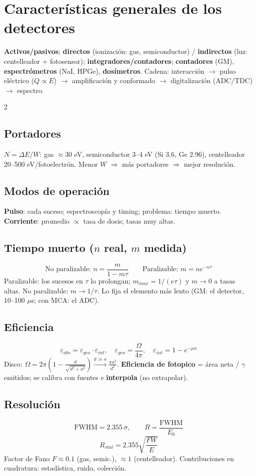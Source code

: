 \documentclass[10pt,a4paper]{article}
\begin{document}
\section{Características generales de los detectores}
\begin{clave}
\textbf{Activos/pasivos}; \textbf{directos} (ionización: gas, semiconductor) / \textbf{indirectos} (luz: centelleador + fotosensor);
\textbf{integradores/contadores}; \textbf{contadores} (GM), \textbf{espectrómetros} (NaI, HPGe), \textbf{dosímetros}.
Cadena: interacción $\to$ pulso eléctrico ($Q\propto E$) $\to$ amplificación y conformado $\to$ digitalización (ADC/TDC) $\to$ espectro.
\end{clave}
\begin{multicols}{2}
\subsection{Portadores}
$N=\Delta E/W$: gas $\approx30$ eV, semiconductor 3--4 eV (Si 3.6, Ge 2.96), centelleador 20--500 eV/fotoelectrón. Menor $W$ $\Rightarrow$ más portadores $\Rightarrow$ mejor resolución.
\subsection{Modos de operación}
\textbf{Pulso}: cada suceso; espectroscopía y timing; problema: tiempo muerto. \textbf{Corriente}: promedio $\propto$ tasa de dosis; tasas muy altas.
\subsection{Tiempo muerto ($n$ real, $m$ medida)}
\[ \text{No paralizable: } n=\frac{m}{1-m\tau}\qquad \text{Paralizable: } m=ne^{-n\tau} \]
Paralizable: los sucesos en $\tau$ lo prolongan; $m_{max}=1/(e\tau)$ y $m\to0$ a tasas altas. No paralizable: $m\to1/\tau$.
Lo fija el elemento más lento (GM: el detector, 10--100 $\mu$s; con MCA: el ADC).
\subsection{Eficiencia}
\[ \varepsilon_{abs}=\varepsilon_{geo}\cdot\varepsilon_{int},\quad \varepsilon_{geo}=\frac{\Omega}{4\pi},\quad \varepsilon_{int}=1-e^{-\mu x} \]
Disco: $\Omega=2\pi\left(1-\frac{d}{\sqrt{d^2+a^2}}\right)\xrightarrow{d\gg a}\frac{\pi a^2}{d^2}$.
\textbf{Eficiencia de fotopico} = área neta / $\gamma$ emitidos; se calibra con fuentes e \textbf{interpola} (no extrapolar).
\subsection{Resolución}
\[ \mathrm{FWHM}=2.355\,\sigma,\qquad R=\frac{\mathrm{FWHM}}{E_0} \]
\[ R_{stat}=2.355\sqrt{\frac{FW}{E}} \]
Factor de Fano $F\approx0.1$ (gas, semic.), $\approx1$ (centelleador). Contribuciones en cuadratura: estadística, ruido, colección.
\columnbreak

\end{multicols}
\end{document}

